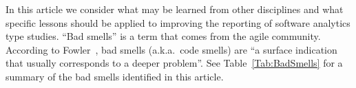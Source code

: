 \documentclass[preprint,10pt]{elsarticle}
\begin{document}

In this article we consider what may be learned from other disciplines and what specific lessons should be applied to improving the reporting of software analytics type studies.  ``Bad smells'' is a term that comes from the agile community. According to Fowler~\cite{beck1999bad}, bad smells (a.k.a.\ code smells) are ``a surface indication that usually corresponds to a deeper problem''.  See Table~\ref{Tab:BadSmells} for a summary of the bad smells identified in this article.
\end{document}
